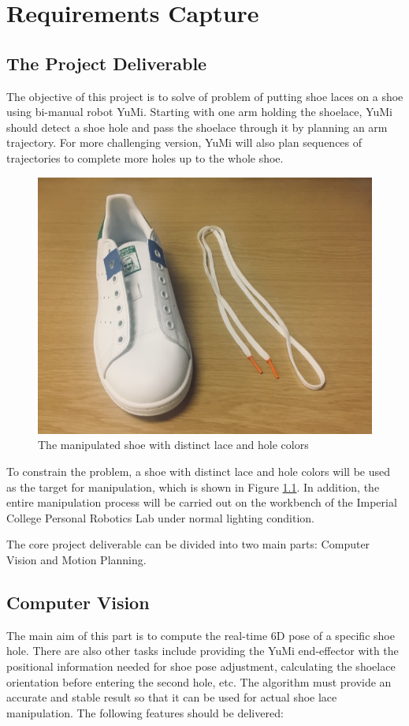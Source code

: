 \chapter{Requirements Capture}

\section{The Project Deliverable}
The objective of this project is to solve of problem of putting shoe laces on a shoe using bi-manual robot YuMi. Starting with one arm holding the shoelace, YuMi should detect a shoe hole and pass the shoelace through it by planning an arm trajectory. For more challenging version, YuMi will also plan sequences of trajectories to complete more holes up to the whole shoe.

\begin{figure}[H]
\centering
\includegraphics[width = 0.5\columnwidth]{RequirementsCap/shoe.jpg}
\caption{The manipulated shoe with distinct lace and hole colors}
\label{shoe}
\end{figure}

To constrain the problem, a shoe with distinct lace and hole colors will be used as the target for manipulation, which is shown in Figure \ref{shoe}. In addition, the entire manipulation process will be carried out on the workbench of the Imperial College Personal Robotics Lab under normal lighting condition.

The core project deliverable can be divided into two main parts: Computer Vision and Motion Planning.

\section{Computer Vision}
The main aim of this part is to compute the real-time 6D pose of a specific shoe hole. There are also other tasks include providing the YuMi end-effector with the positional information needed for shoe pose adjustment, calculating the shoelace orientation before entering the second hole, etc. The algorithm must provide an accurate and stable result so that it can be used for actual shoe lace manipulation. The following features should be delivered:

